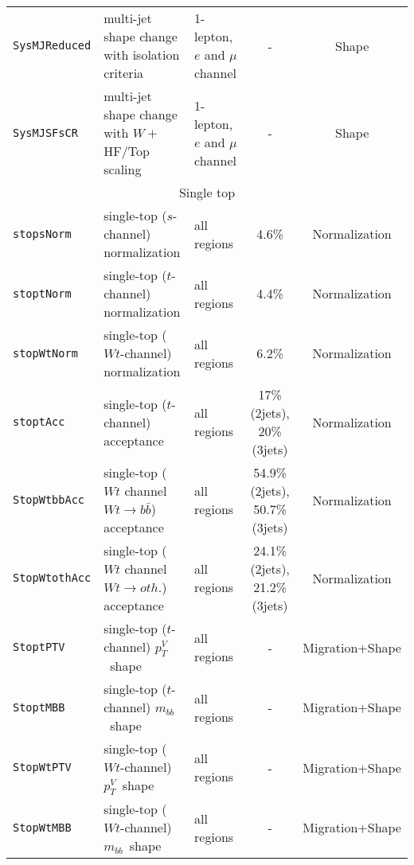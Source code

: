 \begin{table}
{\begin{tabular}{l|llcc}
\texttt{SysMJReduced} & multi-jet shape change with isolation criteria & 1-lepton, $e$ and $\mu$ channel & - & Shape \\
\texttt{SysMJSFsCR} & multi-jet shape change with $W +$HF/Top scaling & 1-lepton, $e$ and $\mu$ channel & - & Shape \\
\hline
\hline
\multicolumn{5}{c}{Single top}\\
\hline
\texttt{stopsNorm}    & single-top ($s$-channel) normalization 	&  all regions	& 4.6\%	&Normalization\\
\texttt{stoptNorm}    & single-top ($t$-channel) normalization 	&  all regions	& 4.4\%	&Normalization\\
\texttt{stopWtNorm}   & single-top ($Wt$-channel) normalization &  all regions	& 6.2\%	&Normalization\\
\texttt{stoptAcc}     & single-top ($t$-channel) acceptance 	&  all regions & 17\% (2jets), 20\% (3jets)	&Normalization\\
\texttt{StopWtbbAcc} 	& single-top ($Wt$ channel $Wt\rightarrow b\bar{b}$) acceptance &  all regions	& 54.9\% (2jets), 50.7\% (3jets)	&Normalization\\
\texttt{StopWtothAcc} 	& single-top ($Wt$ channel $Wt\rightarrow oth.$) acceptance &  all regions	& 24.1\% (2jets), 21.2\% (3jets)	&Normalization\\
\hline
\texttt{StoptPTV} & single-top ($t$-channel) $p_T^V$\ shape & all regions & - & Migration+Shape\\
\texttt{StoptMBB} & single-top ($t$-channel) $m_{bb}$\ shape & all regions & - & Migration+Shape\\
\texttt{StopWtPTV} & single-top ($Wt$-channel) $p_T^V$\ shape & all regions & - & Migration+Shape\\
\texttt{StopWtMBB} & single-top ($Wt$-channel) $m_{bb}$\ shape & all regions & - & Migration+Shape\\

\end{tabular}}
\end{table}
